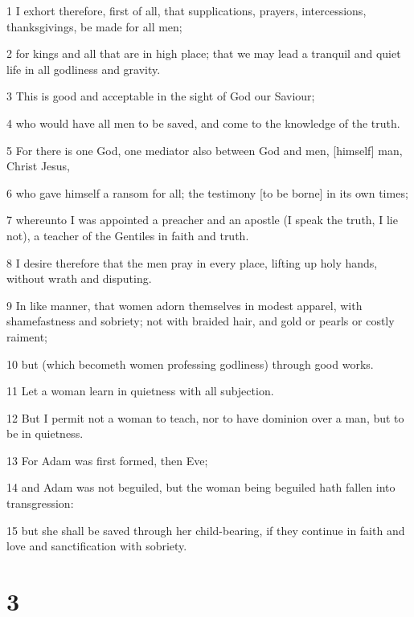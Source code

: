 \par 1 I exhort therefore, first of all, that supplications, prayers, intercessions, thanksgivings, be made for all men;
\par 2 for kings and all that are in high place; that we may lead a tranquil and quiet life in all godliness and gravity.
\par 3 This is good and acceptable in the sight of God our Saviour;
\par 4 who would have all men to be saved, and come to the knowledge of the truth.
\par 5 For there is one God, one mediator also between God and men, [himself] man, Christ Jesus,
\par 6 who gave himself a ransom for all; the testimony [to be borne] in its own times;
\par 7 whereunto I was appointed a preacher and an apostle (I speak the truth, I lie not), a teacher of the Gentiles in faith and truth.
\par 8 I desire therefore that the men pray in every place, lifting up holy hands, without wrath and disputing.
\par 9 In like manner, that women adorn themselves in modest apparel, with shamefastness and sobriety; not with braided hair, and gold or pearls or costly raiment;
\par 10 but (which becometh women professing godliness) through good works.
\par 11 Let a woman learn in quietness with all subjection.
\par 12 But I permit not a woman to teach, nor to have dominion over a man, but to be in quietness.
\par 13 For Adam was first formed, then Eve;
\par 14 and Adam was not beguiled, but the woman being beguiled hath fallen into transgression:
\par 15 but she shall be saved through her child-bearing, if they continue in faith and love and sanctification with sobriety.

\chapter{3}

